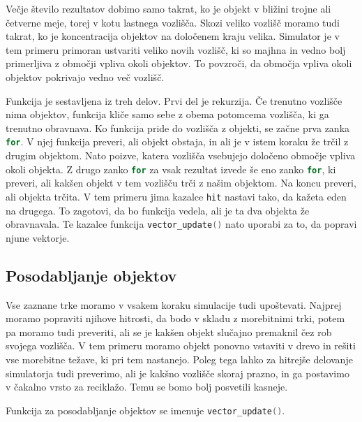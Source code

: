 \documentclass[a4paper,12pt]{article}
\begin{document}
Večje število rezultatov dobimo samo takrat, ko je objekt v bližini trojne ali četverne meje,
torej v kotu lastnega vozlišča. Skozi veliko vozlišč moramo tudi takrat, ko je koncentracija 
objektov na določenem kraju velika. Simulator je v tem primeru primoran ustvariti veliko novih vozlišč, ki so 
majhna in vedno bolj primerljiva z območji vpliva okoli objektov. To povzroči, da območja vpliva okoli objektov
pokrivajo vedno več vozlišč.

Funkcija je sestavljena iz treh delov. Prvi del je rekurzija. Če trenutno vozlišče nima objektov, funkcija kliče samo sebe
z obema potomcema vozlišča, ki ga trenutno obravnava. Ko funkcija pride do vozlišča z objekti, se začne prva zanka \lstinline[language=C]{for}.
V njej funkcija preveri, ali objekt obstaja, in ali je v istem koraku že trčil z drugim objektom. Nato poizve, katera vozlišča
vsebujejo določeno območje vpliva okoli objekta. Z drugo zanko \lstinline[language=C]{for} za vsak rezultat izvede še eno zanko \lstinline[language=C]{for},
ki preveri, ali kakšen objekt v tem vozlišču trči z našim objektom. Na koncu preveri, ali objekta trčita. V tem primeru
jima kazalce \lstinline[language=C]{hit} nastavi tako, da kažeta eden na drugega. To zagotovi, da bo funkcija vedela,
ali je ta dva objekta že obravnavala. Te kazalce funkcija \lstinline[language=C]{vector_update()} nato uporabi za to, da
popravi njune vektorje. 
\subsection{Posodabljanje objektov}
Vse zaznane trke moramo v vsakem koraku simulacije tudi upoštevati. Najprej moramo popraviti njihove hitrosti, da bodo
v skladu z morebitnimi trki, potem pa moramo tudi preveriti, ali se je kakšen objekt slučajno premaknil čez rob svojega
vozlišča. V tem primeru moramo objekt ponovno vstaviti v drevo in rešiti vse morebitne težave, ki pri tem nastanejo.
Poleg tega lahko za hitrejše delovanje simulatorja tudi preverimo, ali je kakšno vozlišče skoraj prazno, in ga postavimo
v čakalno vrsto za reciklažo. Temu se bomo bolj posvetili kasneje.

Funkcija za posodabljanje objektov se imenuje \lstinline[language=C]{vector_update()}.
\end{document}
